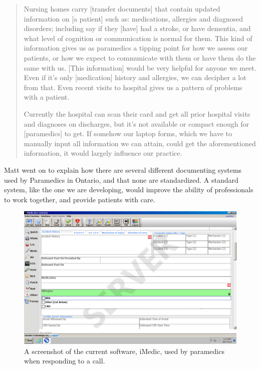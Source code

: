 \blockquote{Nursing homes carry [transfer documents] that contain updated information on [a patient] such as: medications, allergies and diagnosed disorders; including say if they [have] had a stroke, or have dementia, and what level of cognition or communication is normal for them. This kind of information gives us as paramedics a tipping point for how we assess our patients, or how we expect to communicate with them or have them do the same with us. [This information] would be very helpful for anyone we meet. Even if it's only [medication] history and allergies, we can decipher a lot from that. Even recent visits to hospital gives us a pattern of problems with a patient.

Currently the hospital can scan their card and get all prior hospital visits and diagnoses on discharges, but it's not available or compact enough for [paramedics] to get. If somehow our laptop forms, which we have to manually input all information we can attain, could get the aforementioned information, it would largely influence our practice.
}

Matt went on to explain how there are several different documenting systems used by Paramedics in Ontario, and that none are standardized. A standard system, like the one we are developing, would improve the ability of professionals to work together, and provide patients with care.

\begin{figure}[h]
  \centering
  \includegraphics[width=\linewidth]{iMedic.png}
  \captionsetup{format=hang}
  \caption[Screenshot of iMedic Software]{A screenshot of the current software, iMedic, used by paramedics when responding to a call.}
  \label{fig:iMed1}
\end{figure}




